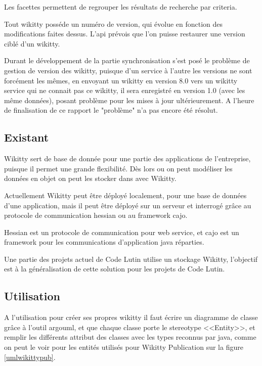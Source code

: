 Les facettes permettent de regrouper les résultats de recherche par criteria. 

Tout wikitty posséde un numéro de version, qui évolue en fonction des
modifications faites dessus. L'api prévois que l'on puisse restaurer une version
ciblé d'un wikitty.

Durant le développement de la partie synchronisation s'est posé le problème de 
gestion de version des wikitty, puisque d'un service à l'autre les versions ne 
sont forcément les mêmes, en envoyant un wikitty en version 8.0 vers un wikitty
service qui ne connait pas ce wikitty, il sera enregistré en version 1.0 (avec les
même données), posant problème pour les mises à jour ultérieurement. A l'heure
de finalisation de ce rapport le "problème" n'a pas encore été résolut.

\subsection{Existant}

Wikitty sert de base de donnée pour une partie des applications de l'entreprise,
puisque il permet une grande flexibilité. Dès lors ou on peut modéliser les
données en objet on peut les stocker dans avec Wikitty.

Actuellement Wikitty peut être déployé localement, pour une base de données
d'une application, mais il peut être déployé sur un serveur et interrogé grâce
au protocole de communication hessian ou au framework cajo.

Hessian est un protocole de communication pour web service, et cajo est un
framework pour les communications d'application java réparties. 

Une partie des projets actuel de Code Lutin utilise un stockage Wikitty, 
l'objectif est à la généralisation de cette solution pour les projets de 
Code Lutin.

\subsection{Utilisation}

A l'utilisation pour créer ses propres wikitty il faut écrire un diagramme de
classe grâce à l'outil argouml, et que chaque classe porte le stereotype
<<Entity>>, et remplir les différents attribut des classes avec les types
reconnus par java, comme on peut le voir pour les entités utilisés pour Wikitty
Publication sur la figure \ref{umlwikittypub}. 

